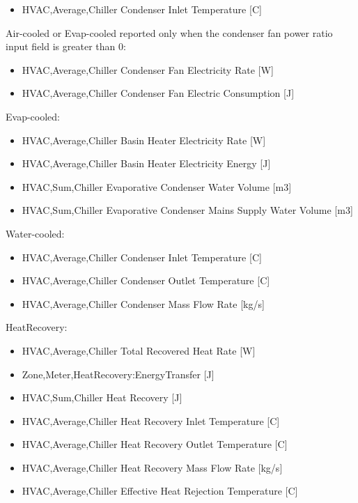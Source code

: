 \begin{itemize}
\tightlist
\item
  HVAC,Average,Chiller Condenser Inlet Temperature {[}C{]}
\end{itemize}

Air-cooled or Evap-cooled reported only when the condenser fan power ratio input field is greater than 0:

\begin{itemize}
\item
  HVAC,Average,Chiller Condenser Fan Electricity Rate {[}W{]}
\item
  HVAC,Average,Chiller Condenser Fan Electric Consumption {[}J{]}
\end{itemize}

Evap-cooled:

\begin{itemize}
\item
  HVAC,Average,Chiller Basin Heater Electricity Rate {[}W{]}
\item
  HVAC,Average,Chiller Basin Heater Electricity Energy {[}J{]}
\item
  HVAC,Sum,Chiller Evaporative Condenser Water Volume {[}m3{]}
\item
  HVAC,Sum,Chiller Evaporative Condenser Mains Supply Water Volume {[}m3{]}
\end{itemize}

Water-cooled:

\begin{itemize}
\item
  HVAC,Average,Chiller Condenser Inlet Temperature {[}C{]}
\item
  HVAC,Average,Chiller Condenser Outlet Temperature {[}C{]}
\item
  HVAC,Average,Chiller Condenser Mass Flow Rate {[}kg/s{]}
\end{itemize}

HeatRecovery:

\begin{itemize}
\item
  HVAC,Average,Chiller Total Recovered Heat Rate {[}W{]}
\item
  Zone,Meter,HeatRecovery:EnergyTransfer {[}J{]}
\item
  HVAC,Sum,Chiller Heat Recovery {[}J{]}
\item
  HVAC,Average,Chiller Heat Recovery Inlet Temperature {[}C{]}
\item
  HVAC,Average,Chiller Heat Recovery Outlet Temperature {[}C{]}
\item
  HVAC,Average,Chiller Heat Recovery Mass Flow Rate {[}kg/s{]}
\item
  HVAC,Average,Chiller Effective Heat Rejection Temperature {[}C{]}
\end{itemize}

